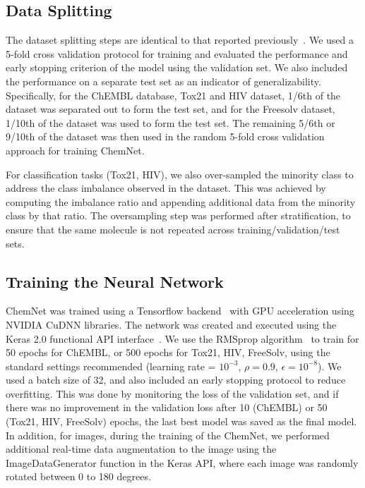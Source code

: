 \documentclass[sigconf]{acmart}
\begin{document}
\subsection{Data Splitting}
The dataset splitting steps are identical to that reported previously~\cite{goh2017c1}. We used a 5-fold cross validation protocol for training and evaluated the performance and early stopping criterion of the model using the validation set. We also included the performance on a separate test set as an indicator of generalizability. Specifically, for the ChEMBL database, Tox21 and HIV dataset, 1/6th of the dataset was separated out to form the test set, and for the Freesolv dataset, 1/10th of the dataset was used to form the test set. The remaining 5/6th or 9/10th of the dataset was then used in the random 5-fold cross validation approach for training ChemNet.

For classification tasks (Tox21, HIV), we also over-sampled the minority class to address the class imbalance observed in the dataset. This was achieved by computing the imbalance ratio and appending additional data from the minority class by that ratio. The oversampling step was performed after stratification, to ensure that the same molecule is not repeated across training/validation/test sets.

\subsection{Training the Neural Network}
ChemNet was trained using a Tensorflow backend~\cite{abadi2016} with GPU acceleration using NVIDIA CuDNN libraries\cite{chetlur2014}. The network was created and executed using the Keras 2.0 functional API interface~\cite{chollet2015}. We use the RMSprop algorithm~\cite{hinton2012} to train for 50 epochs for ChEMBL, or 500 epochs for Tox21, HIV, FreeSolv, using the standard settings recommended (learning rate = $10^{-3}$, $\rho = 0.9$, $\epsilon = 10^{-8}$). We used a batch size of 32, and also included an early stopping protocol to reduce overfitting. This was done by monitoring the loss of the validation set, and if there was no improvement in the validation loss after 10 (ChEMBL) or 50 (Tox21, HIV, FreeSolv) epochs, the last best model was saved as the final model. In addition, for images, during the training of the ChemNet, we performed additional real-time data augmentation to the image using the ImageDataGenerator function in the Keras API, where each image was randomly rotated between 0 to 180 degrees.
\end{document}
